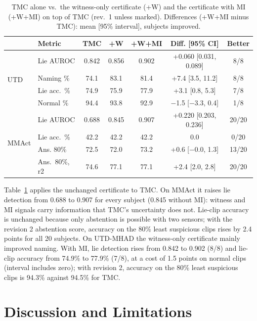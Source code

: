 \documentclass[conference]{IEEEtran}
\begin{document}
\begin{table}[t]
\centering
\caption{TMC alone vs.\ the witness-only certificate (+W) and the certificate with MI (+W+MI) on top of TMC (rev.\ 1 unless marked). Differences (+W+MI minus TMC): mean [95\% interval], subjects improved.}
\label{tab:ontmc}
\setlength{\tabcolsep}{1.6pt}
\footnotesize
\begin{tabular}{llccccc}
\toprule
 & Metric & TMC & +W & +W+MI & Diff. [95\% CI] & Better \\
\midrule
\multirow{4}{*}{UTD} & Lie AUROC & 0.842 & 0.856 & 0.902 & +0.060 [0.031, 0.089] & 8/8 \\
 & Naming \% & 74.1 & 83.1 & 81.4 & +7.4 [3.5, 11.2] & 8/8 \\
 & Lie acc.\ \% & 74.9 & 75.9 & 77.9 & +3.1 [0.8, 5.3] & 7/8 \\
 & Normal \% & 94.4 & 93.8 & 92.9 & $-$1.5 [$-$3.3, 0.4] & 1/8 \\
\midrule
\multirow{4}{*}{MMAct} & Lie AUROC & 0.688 & 0.845 & 0.907 & +0.220 [0.203, 0.236] & 20/20 \\
 & Lie acc.\ \% & 42.2 & 42.2 & 42.2 & 0.0 & 0/20 \\
 & Ans. 80\% & 72.5 & 72.0 & 73.2 & +0.6 [$-$0.0, 1.3] & 13/20 \\
 & Ans.\ 80\%, r2 & 74.6 & 77.1 & 77.1 & +2.4 [2.0, 2.8] & 20/20 \\
\bottomrule
\end{tabular}
\end{table}

Table~\ref{tab:ontmc} applies the unchanged certificate to TMC. On MMAct it raises lie detection from 0.688 to 0.907 for every subject (0.845 without MI): witness and MI signals carry information that TMC's uncertainty does not. Lie-clip accuracy is unchanged because only abstention is possible with two sensors; with the revision 2 abstention score, accuracy on the 80\% least suspicious clips rises by 2.4 points for all 20 subjects. On UTD-MHAD the witness-only certificate mainly improved naming. With MI, lie detection rises from 0.842 to 0.902 (8/8) and lie-clip accuracy from 74.9\% to 77.9\% (7/8), at a cost of 1.5 points on normal clips (interval includes zero); with revision 2, accuracy on the 80\% least suspicious clips is 94.3\% against 94.5\% for TMC.

\section{Discussion and Limitations}
\end{document}
